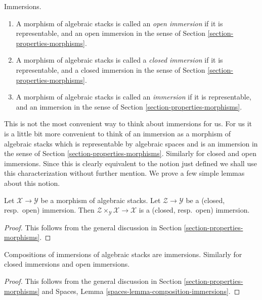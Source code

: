 \begin{definition}
\label{definition-immersion}
Immersions.
\begin{enumerate}
\item A morphism of algebraic stacks is called an {\it open immersion}
if it is representable, and an open immersion
in the sense of
Section \ref{section-properties-morphisms}.
\item A morphism of algebraic stacks is called a {\it closed immersion}
if it is representable, and a closed immersion
in the sense of
Section \ref{section-properties-morphisms}.
\item A morphism of algebraic stacks is called an {\it immersion}
if it is representable, and an immersion
in the sense of
Section \ref{section-properties-morphisms}.
\end{enumerate}
\end{definition}

\noindent
This is not the most convenient way to think about immersions for us.
For us it is a little bit more convenient to think of an immersion
as a morphism of algebraic stacks which is representable by algebraic
spaces and is an immersion in the sense of
Section \ref{section-properties-morphisms}.
Similarly for closed and open immersions.
Since this is clearly equivalent to the notion just defined we shall
use this characterization without further mention.
We prove a few simple lemmas about this notion.

\begin{lemma}
\label{lemma-base-change-immersion}
Let $\mathcal{X} \to \mathcal{Y}$ be a morphism of algebraic stacks.
Let $\mathcal{Z} \to \mathcal{Y}$ be a
(closed, resp.\ open) immersion.
Then $\mathcal{Z} \times_\mathcal{Y} \mathcal{X} \to \mathcal{X}$
is a (closed, resp.\ open) immersion.
\end{lemma}

\begin{proof}
This follows from the general discussion in
Section \ref{section-properties-morphisms}.
\end{proof}

\begin{lemma}
\label{lemma-composition-immersion}
Compositions of immersions of algebraic stacks are immersions.
Similarly for closed immersions and open immersions.
\end{lemma}

\begin{proof}
This follows from the general discussion in
Section \ref{section-properties-morphisms}
and
Spaces, Lemma \ref{spaces-lemma-composition-immersions}.
\end{proof}


